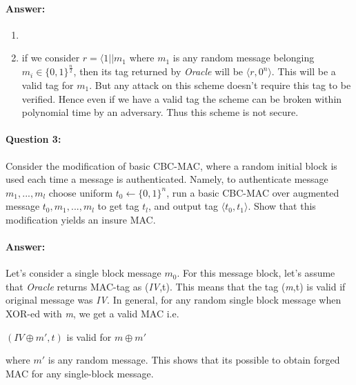 \documentclass{article}
\begin{document}
    \paragraph{Answer: \newline}
        \begin{enumerate}
            \item 
            \item
                if we consider $r = \langle 1 || m_1$ where $m_1$ is any random message belonging $m_i \in {\{0,1\}}^\frac{n}{2}$, then its tag returned by \emph{Oracle} will be $\langle r,{0^n} \rangle$. This will be a valid tag for $m_1$. But any attack on this scheme doesn't require this tag to be verified. \newline
                Hence even if we have a valid tag the scheme can be broken within polynomial time by an adversary. Thus this scheme is not secure.
                \citep{section5question32}
        \end{enumerate}
    
    \paragraph{Question 3:} Consider the modification of basic CBC-MAC, where a random initial block is used each time a message is authenticated. Namely, to authenticate message $m_1,...,m_l$ choose uniform $t_0 \leftarrow{{\{0,1\}}^n}$, run a basic CBC-MAC over augmented message $t_0,m_1,...,m_l$ to get tag $t_l$, and output tag $\langle{t_0,t_1}\rangle$. Show that this modification yields an insure MAC.
    \paragraph{Answer: \newline}
    Let's consider a single block message $m_0$. For this message block, let's assume that \emph{Oracle} returns MAC-tag as (\emph{IV},t). This means that the tag (\emph{m},t) is valid if original message was \emph{IV}. \newline
    In general, for any random single block message when XOR-ed with \emph{m}, we get a valid MAC i.e.
    \begin{center}
        $(IV \oplus{m\prime},t)$ is valid for ${m\oplus{m\prime}}$
    \end{center}
    where $m\prime$ is any random message.\newline
    This shows that its possible to obtain forged MAC for any single-block message.
\end{document}
